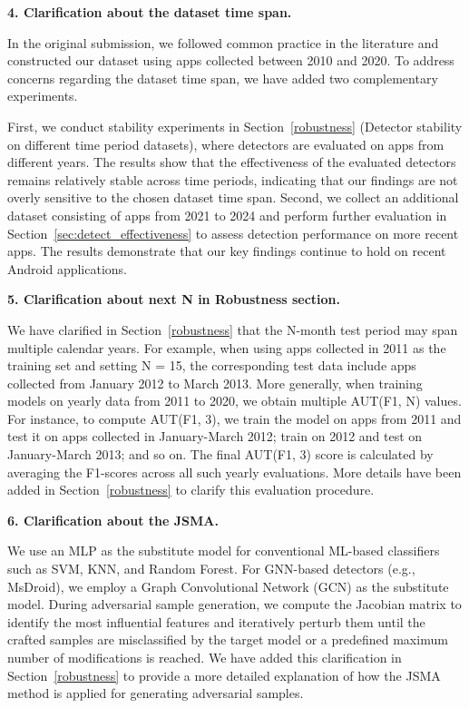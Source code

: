 \vspace{0.1cm}
\noindent \textbf{4. Clarification about the dataset time span.}

In the original submission, we followed common practice in the literature and constructed our dataset using apps collected between 2010 and 2020. To address concerns regarding the dataset time span, we have added two complementary experiments.

First, we conduct stability experiments in Section~\ref{robustness} (Detector stability on different time period datasets), where detectors are evaluated on apps from different years. The results show that the effectiveness of the evaluated detectors remains relatively stable across time periods, indicating that our findings are not overly sensitive to the chosen dataset time span.
Second, we collect an additional dataset consisting of apps from 2021 to 2024 and perform further evaluation in Section~\ref{sec:detect_effectiveness} to assess detection performance on more recent apps. The results demonstrate that our key findings continue to hold on recent Android applications.

\vspace{0.1cm}
\noindent \textbf{5. Clarification about next N in Robustness section.}

We have clarified in Section~\ref{robustness} that the N-month test period may span multiple calendar years. For example, when using apps collected in 2011 as the training set and setting N = 15, the corresponding test data include apps collected from January 2012 to March 2013.
More generally, when training models on yearly data from 2011 to 2020, we obtain multiple AUT(F1, N) values. For instance, to compute AUT(F1, 3), we train the model on apps from 2011 and test it on apps collected in January-March 2012; train on 2012 and test on January-March 2013; and so on. The final AUT(F1, 3) score is calculated by averaging the F1-scores across all such yearly evaluations.
More details have been added in Section~\ref{robustness} to clarify this evaluation procedure.

\vspace{0.1cm}
\noindent \textbf{6. Clarification about the JSMA.}

We use an MLP as the substitute model for conventional ML-based classifiers such as SVM, KNN, and Random Forest. For GNN-based detectors (e.g., MsDroid), we employ a Graph Convolutional Network (GCN) as the substitute model. During adversarial sample generation, we compute the Jacobian matrix to identify the most influential features and iteratively perturb them until the crafted samples are misclassified by the target model or a predefined maximum number of modifications is reached.
We have added this clarification in Section~\ref{robustness} to provide a more detailed explanation of how the JSMA method is applied for generating adversarial samples.